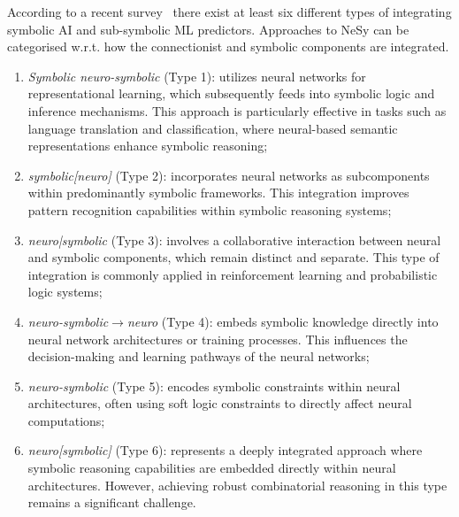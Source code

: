 According to a recent survey~\cite{DBLP:journals/nca/BhuyanRTS24} there exist at least six different types of integrating symbolic \gls{AI} and sub-symbolic \gls{ML} predictors.
%
Approaches to \gls{NeSy} can be categorised w.r.t. how the connectionist and symbolic components are integrated.
%
\begin{enumerate}
    \item \emph{Symbolic neuro-symbolic} (Type 1): utilizes neural networks for representational learning, which subsequently feeds into symbolic logic and inference mechanisms.
    This approach is particularly effective in tasks such as language translation and classification, where neural-based semantic representations enhance symbolic reasoning;
    \item \emph{symbolic[neuro]} (Type 2): incorporates neural networks as subcomponents within predominantly symbolic frameworks.
    This integration improves pattern recognition capabilities within symbolic reasoning systems;
    \item \emph{neuro|symbolic} (Type 3): involves a collaborative interaction between neural and symbolic components, which remain distinct and separate.
    This type of integration is commonly applied in reinforcement learning and probabilistic logic systems;
    \item \emph{neuro-symbolic$\rightarrow$neuro} (Type 4): embeds symbolic knowledge directly into neural network architectures or training processes.
    This influences the decision-making and learning pathways of the neural networks;
    \item \emph{neuro-symbolic} (Type 5): encodes symbolic constraints within neural architectures, often using soft logic constraints to directly affect neural computations;
    \item \emph{neuro[symbolic]} (Type 6): represents a deeply integrated approach where symbolic reasoning capabilities are embedded directly within neural architectures.
    However, achieving robust combinatorial reasoning in this type remains a significant challenge.
\end{enumerate}

